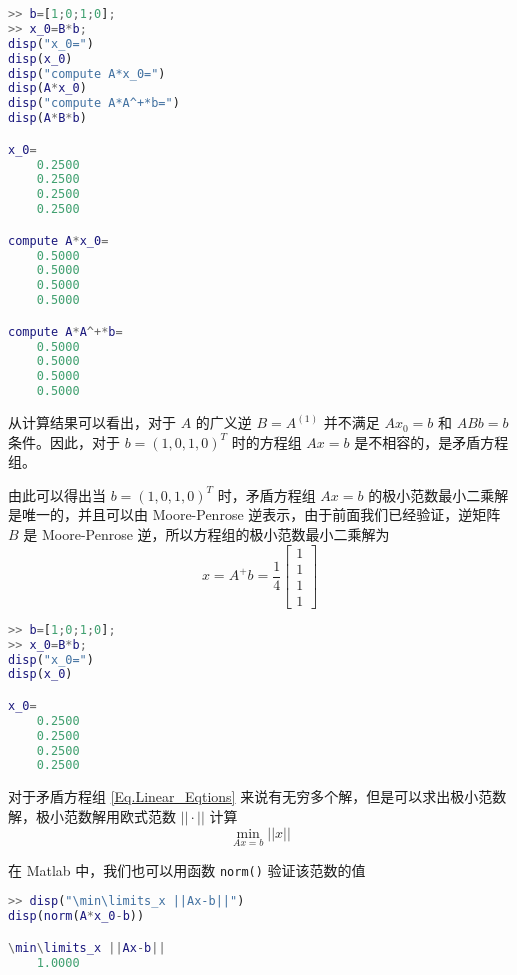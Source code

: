 \begin{lstlisting}[language=Matlab]  
>> b=[1;0;1;0];
>> x_0=B*b;
disp("x_0=")
disp(x_0)
disp("compute A*x_0=")
disp(A*x_0)
disp("compute A*A^+*b=")
disp(A*B*b)

x_0=
    0.2500
    0.2500
    0.2500
    0.2500

compute A*x_0=
    0.5000
    0.5000
    0.5000
    0.5000

compute A*A^+*b=
    0.5000
    0.5000
    0.5000
    0.5000
\end{lstlisting}

从计算结果可以看出，对于 $A$ 的广义逆 $B=A^{(1)}$ 并不满足 $Ax_0=b$ 和 $ABb=b$ 条件。因此，对于 $b=(1,0,1,0)^T$ 时的方程组 $Ax=b$ 是不相容的，是矛盾方程组。

由此可以得出当 $b=(1,0,1,0)^T$ 时，矛盾方程组 $Ax=b$ 的极小范数最小二乘解是唯一的，并且可以由 Moore-Penrose 逆表示，由于前面我们已经验证，逆矩阵 $B$ 是 Moore-Penrose 逆，所以方程组的极小范数最小二乘解为
\begin{equation}
    x=A^+b=\frac{1}{4}\begin{bmatrix}
        1 \\ 1 \\ 1 \\ 1
    \end{bmatrix}
\end{equation}
\begin{lstlisting}[language=Matlab]  
>> b=[1;0;1;0];
>> x_0=B*b;
disp("x_0=")
disp(x_0)

x_0=
    0.2500
    0.2500
    0.2500
    0.2500
\end{lstlisting}


对于矛盾方程组 \ref{Eq.Linear_Eqtions} 来说有无穷多个解，但是可以求出极小范数解，极小范数解用欧式范数 $||\cdot||$ 计算
\begin{equation}
    \min\limits_{Ax=b}||x||
\end{equation}

在 Matlab 中，我们也可以用函数 \lstinline|norm()|  验证该范数的值
\begin{lstlisting}[language=Matlab] 
>> disp("\min\limits_x ||Ax-b||")
disp(norm(A*x_0-b))

\min\limits_x ||Ax-b||
    1.0000
\end{lstlisting}
